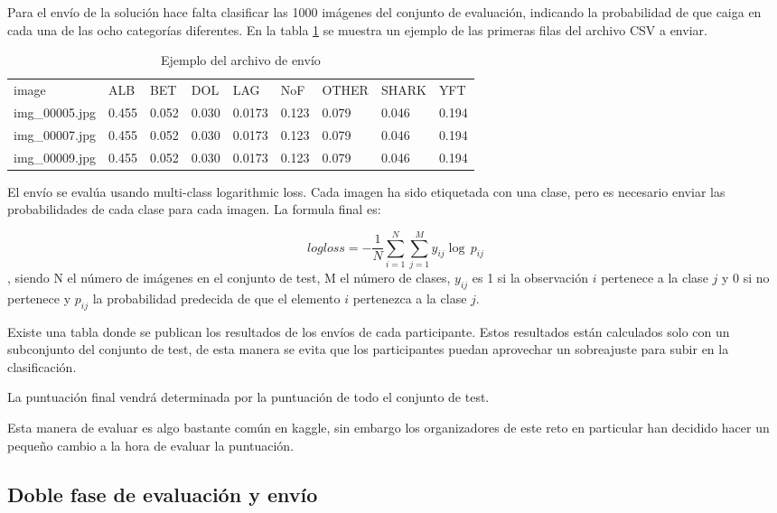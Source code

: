 Para el envío de la solución hace falta clasificar las 1000 imágenes del conjunto de evaluación, indicando la probabilidad de que caiga en cada una de las ocho categorías diferentes. En la tabla \ref{submission-sample} se muestra un ejemplo de las primeras filas del archivo CSV a enviar.

\begin{table}[]
\centering
\caption{Ejemplo del archivo de envío}
\label{submission-sample}
\begin{tabular}{lllllllll}
image          & ALB   & BET   & DOL   & LAG    & NoF   & OTHER & SHARK  & YFT  \\
img\_00005.jpg & 0.455 & 0.052 & 0.030 & 0.0173 & 0.123 & 0.079 & 0.046 & 0.194\\
img\_00007.jpg & 0.455 & 0.052 & 0.030 & 0.0173 & 0.123 & 0.079 & 0.046 & 0.194\\
img\_00009.jpg & 0.455 & 0.052 & 0.030 & 0.0173 & 0.123 & 0.079 & 0.046 & 0.194
\end{tabular}
\end{table}

El envío se evalúa usando multi-class logarithmic loss. Cada imagen ha sido etiquetada con una clase, pero es necesario enviar las probabilidades de cada clase para cada imagen. La formula final es:

\[
  logloss =
  - \frac{1}{N} \sum_{i=1}^N \sum_{j=1}^M y_{ij} \log \, p_{ij}
\],
 siendo N el número de imágenes en el conjunto de test, M el número de clases, $y_{ij}$ es 1 si la observación $i$ pertenece a la clase $j$ y 0 si no pertenece y $p_{ij}$ la probabilidad predecida de que el elemento $i$ pertenezca a la clase $j$.


 Existe una tabla donde se publican los resultados de los envíos de cada participante. Estos resultados están calculados solo con un subconjunto del conjunto de test, de esta manera se evita que los participantes puedan aprovechar un sobreajuste para subir en la clasificación.

La puntuación final vendrá determinada por la puntuación de todo el conjunto de test.

Esta manera de evaluar es algo bastante común en kaggle, sin embargo los organizadores de este reto en particular han decidido hacer un pequeño cambio a la hora de evaluar la puntuación.

\subsection{Doble fase de evaluación y envío}

